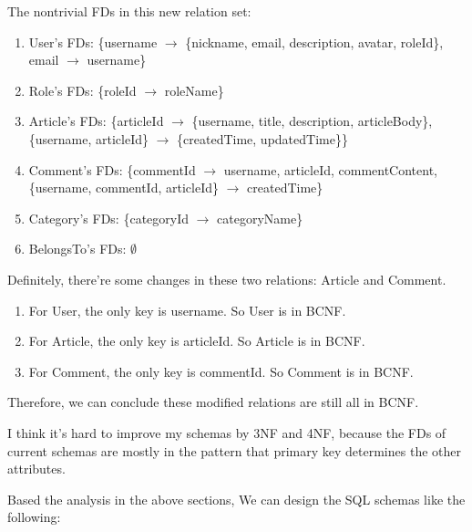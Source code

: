 \documentclass[11pt]{homework}
\begin{document}
  The nontrivial FDs in this new relation set:
  \begin{enumerate}
    \item User's FDs: \{username $\rightarrow$ \{nickname, email, description, avatar, roleId\}, email $\rightarrow$ username\}
    \item Role's FDs: \{roleId $\rightarrow$ roleName\}
    \item Article's FDs: \{articleId $\rightarrow$ \{username, title, description, articleBody\}, \{username, articleId\} $\rightarrow$ \{createdTime, updatedTime\}\}
    \item Comment's FDs: \{commentId $\rightarrow$ username, articleId, commentContent, \{username, commentId, articleId\} $\rightarrow$ createdTime\}
    \item Category's FDs: \{categoryId $\rightarrow$ categoryName\}
    \item BelongsTo's FDs: $\emptyset$
  \end{enumerate}

  Definitely, there're some changes in these two relations: Article and Comment.

  \begin{enumerate}
    \item For User, the only key is username. So User is in BCNF.
    \item For Article, the only key is articleId. So Article is in BCNF.
    \item For Comment, the only key is commentId. So Comment is in BCNF.
  \end{enumerate}

  Therefore, we can conclude these modified relations are still all in BCNF.

  I think it's hard to improve my schemas by 3NF and 4NF, because the FDs of current schemas are mostly in the pattern
  that primary key determines the other attributes. 



















  Based the analysis in the above sections, We can design the SQL schemas like the following:

  \newpage
\end{document}
